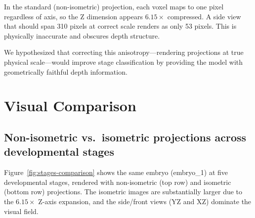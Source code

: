 \documentclass[11pt, a4paper]{article}
\begin{document}
In the standard (non-isometric) projection, each voxel maps to one pixel
regardless of axis, so the Z dimension appears $6.15\times$ compressed.  A
side view that should span 310 pixels at correct scale renders as only 53
pixels.  This is physically inaccurate and obscures depth structure.

We hypothesized that correcting this anisotropy---rendering projections at
true physical scale---would improve stage classification by providing the model
with geometrically faithful depth information.

\section{Visual Comparison}

\subsection{Non-isometric vs.\ isometric projections across developmental stages}

Figure~\ref{fig:stages-comparison} shows the same embryo (embryo\_1) at five
developmental stages, rendered with non-isometric (top row) and isometric
(bottom row) projections.  The isometric images are substantially larger due
to the $6.15\times$ Z-axis expansion, and the side/front views (YZ and XZ)
dominate the visual field.
\end{document}
